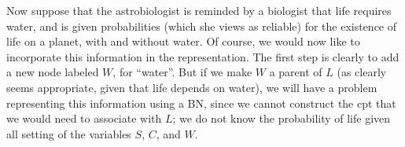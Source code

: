 \documentclass{article}
\numberwithin{equation}{section}
\begin{document}
\begin{example}
	
		Now suppose that the astrobiologist is reminded by a biologist that life
		requires water, and is given probabilities (which she views as
		reliable) for the existence of life on a planet, with and 
		without water. Of course, we would now like to incorporate this
		information in the representation.  The first step is clearly to add a
		new node labeled $W$, for ``water''.  But if we make $W$ a parent of
		$L$ (as clearly seems appropriate, given that life depends on water), we
		will have a problem representing this information using a BN, since 
		we cannot construct the cpt that we would need to associate with $L$;
		we do not know the probability of life given all setting of the
		variables  $S$, $C$, and $W$.
		


\end{example}
\end{document}
